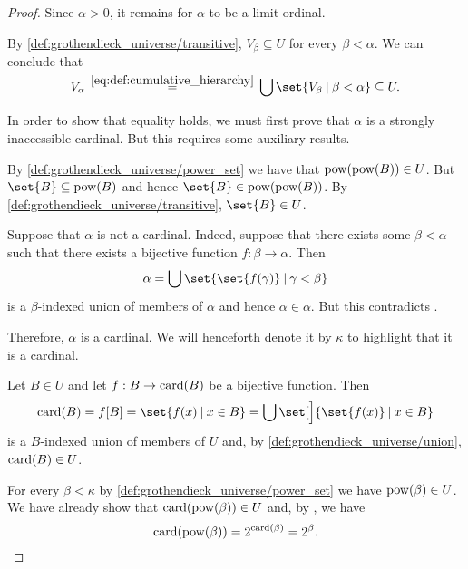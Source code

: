 \begin{proof}
  Since \( \alpha > 0 \), it remains for \( \alpha \) to be a limit ordinal.

   By \ref{def:grothendieck_universe/transitive}, \( V_\beta \subseteq U \) for every \( \beta < \alpha \). We can conclude that
  \begin{equation*}
    V_\alpha
    \reloset {\eqref{eq:def:cumulative_hierarchy}} =
    \bigcup\set{ V_\beta \given \beta < \alpha }
    \subseteq
    U.
  \end{equation*}

  In order to show that equality holds, we must first prove that \( \alpha \) is a strongly inaccessible cardinal. But this requires some auxiliary results.

   By \ref{def:grothendieck_universe/power_set} we have that \( \operatorname{pow}(\operatorname{pow}(B)) \in U \). But \( \set{ B } \subseteq \pow(B) \) and hence \( \set{ B } \in \pow(\pow(B)) \). By \ref{def:grothendieck_universe/transitive}, \( \set{ B } \in U \).

   Suppose that \( \alpha \) is not a cardinal. Indeed, suppose that there exists some \( \beta < \alpha \) such that there exists a bijective function \( f: \beta \to \alpha \). Then
  \begin{equation*}
    \alpha = \bigcup\set{ \set{ f(\gamma) } \given \gamma < \beta }
  \end{equation*}
  is a \( \beta \)-indexed union of members of \( \alpha \) and hence \( \alpha \in \alpha \). But this contradicts .

  Therefore, \( \alpha \) is a cardinal. We will henceforth denote it by \( \kappa \) to highlight that it is a cardinal.

   Let \( B \in U \) and let \( f: B \to \operatorname{card}(B) \) be a bijective function. Then
  \begin{equation*}
    \card(B)
    =
    f[B]
    =
    \set{ f(x) \given x \in B }
    =
    \bigcup\set[\Big]{ \set{ f(x) } \given x \in B }
  \end{equation*}
   is a \( B \)-indexed union of members of \( U \) and, by \ref{def:grothendieck_universe/union}, \( \operatorname{card}(B) \in U \).

   For every \( \beta < \kappa \) by \ref{def:grothendieck_universe/power_set} we have \( \operatorname{pow}(\beta) \in U \). We have already show that \( \operatorname{card}(\operatorname{pow}(\beta)) \in U \) and, by , we have
  \begin{equation*}
    \operatorname{card}(\operatorname{pow}(\beta)) = 2^{\operatorname{card}(\beta)} = 2^\beta.
  \end{equation*}


\end{proof}
